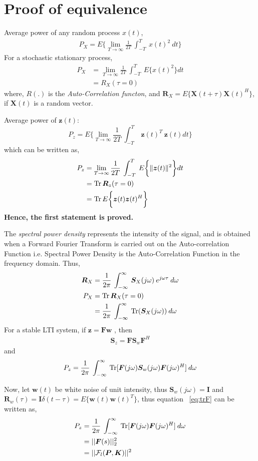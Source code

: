 \section{Proof of equivalence}
Average power of any random process $x(t)$,
\begin{align*}
    P_X = E\Biggl\{\lim_{T\to\infty} \frac{1}{2T}\:\int_{-T}^T\: x(t)^2\:dt\Biggr\}
\end{align*}
For a stochastic stationary process,
\begin{align*}
P_X &= \lim_{T\to\infty} \frac{1}{2T}\:\int_{-T}^T\: E\biggl\{x(t)^2\biggr\}dt \\
	&= R_X(\tau=0) 
\end{align*}
where, $R(.)$ is the \emph{Auto-Correlation functon}, and $\mathbf{R}_X = E\biggl\{\bm{X}(t+\tau)\bm{X}(t)^H\biggr\}$, if $\bm{X}(t)$ is a random vector.

Average power of $\bm{z}(t)$:
\begin{equation}
P_{z} = E\Biggl\{\lim_{T\to\infty} \frac{1}{2T}\:\int_{-T}^T\: \bm{z}(t)^T\: \bm{z}(t)dt\Biggr\} 
\end{equation}
which can be written as,
\begin{align*}
    P_{z}&= \lim_{T\to\infty} \frac{1}{2T}\:\int_{-T}^T\: E\biggl\{\|\bm{z}(t)\|^2\biggr\}dt \\
	&= \operatorname{Tr}\bm{R}_z(\tau=0)\\
    &= \operatorname{Tr} E\biggl\{\bm{z}(t)\bm{z}(t)^H\biggr\}
\end{align*}
\textbf{Hence, the first statement is proved.}

The \emph{spectral power density} represents the intensity of the signal, and is obtained when a Forward Fourier Transform is carried out on the Auto-correlation Function i.e. Spectral Power Density is the Auto-Correlation Function in the frequency domain. Thus,
\begin{align*}
    \bm{R}_X &= \frac{1}{2\pi}\: \int_{-\infty}^{\infty}\: \bm{S}_X(j\omega)\: e^{j\omega\tau}\:d\omega \\
    P_X &= \operatorname{Tr}\bm{R}_X(\tau=0)\\
    &= \frac{1}{2\pi}\: \int_{-\infty}^{\infty}\: \operatorname{Tr}(\bm{S}_X(j\omega))\: d\omega
\end{align*}
For a stable LTI system, if $\bm{z} = \bm{Fw}$ , then
\begin{align*}
    \bm{S}_{z}=\bm{F}\bm{S}_w\bm{F}^H
\end{align*}
and
\begin{equation}
    P_z = \frac{1}{2\pi}\: \int_{-\infty}^{\infty}\: \operatorname{Tr}[\bm{F}(j\omega)\bm{S}_w(j\omega)\bm{F}(j\omega)^H]\: d\omega
    \label{eq:trF}
\end{equation}

Now, let $\bm{w}(t)$ be white noise of unit intensity, thus $\bm{S}_w(j\omega)=\bm{I}$ and $\bm{R}_w(\tau)= \bm{I}\delta(t - \tau)=E\biggl\{\bm{w}(t)\bm{w}(t)^T\biggr\}$, thus equation ~\eqref{eq:trF} can be written as,
\begin{align*}
P_z &= \frac{1}{2\pi}\: \int_{-\infty}^{\infty}\: \operatorname{Tr}[\bm{F}(j\omega)\bm{F}(j\omega)^H]\: d\omega \\
	&= ||\bm{F}(s)||_2^2 \\
	&= ||\mathcal{F}_l(\bm{P},\bm{K})||^2
\end{align*}